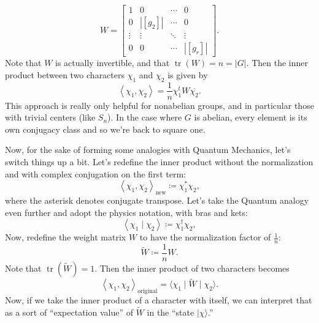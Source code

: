 \documentclass[12pt]{article}
\newcommand{\vbrack}[1]{\left \langle #1 \right \rangle}
\theoremstyle{definition}
\DeclareMathOperator\tr{tr}
\begin{document}
\begin{equation}
    W = 
    \begin{bmatrix}
        1 & 0 & \cdots & 0 \\
        0 & |[g_2]| & \cdots & 0 \\
        \vdots & \vdots & \ddots & \vdots \\
        0 & 0 & \cdots & |[g_r]|
    \end{bmatrix}.
\end{equation}
Note that $W$ is actually invertible, and that $\tr(W) = n = |G|$. Then the inner product between two characters $\chi_1$ and $\chi_2$ is given by 
\begin{equation}
    \vbrack{\chi_1 , \chi_2} = \frac{1}{n} \chi_1^t W \overline{\chi_2}.
\end{equation}
This approach is really only helpful for nonabelian groups, and in particular those with trivial centers (like $S_n$). In the case where $G$ is abelian, every element is its own conjugacy class and so we're back to square one.

Now, for the sake of forming some analogies with Quantum Mechanics, let's switch things up a bit. Let's redefine the inner product without the normalization and with complex conjugation on the first term:
\begin{equation}
    \vbrack{\chi_1 , \chi_2}_{\text{new}} \coloneqq  \chi_1^{\ast} \chi_2,
\end{equation}
where the asterisk denotes conjugate transpose. Let's take the Quantum analogy even further and adopt the physics notation, with bras and kets:
\begin{equation}
    \vbrack{\chi_1 \mid \chi_2} \coloneqq  \chi_1^{\dagger} \chi_2,
\end{equation}
Now, redefine the weight matrix $W$ to have the normalization factor of $\frac{1}{n}$:
\begin{equation}
    \tilde{W} \coloneqq  \frac{1}{n} W.
\end{equation}
Note that $\tr \left( \tilde{W} \right) = 1$. Then the inner product of two characters becomes
\begin{equation}
    \vbrack{\chi_1 , \chi_2}_{\text{original}} = \langle \chi_1 \mid \tilde{W} \mid \chi_2 \rangle.
\end{equation}
Now, if we take the inner product of a character with itself, we can interpret that as a sort of ``expectation value'' of $\tilde{W}$ in the ``state $\mid \chi \rangle$.''
\end{document}
